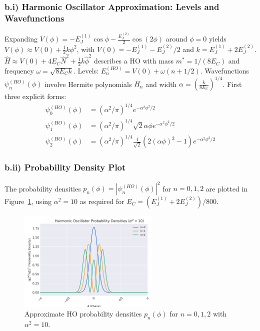 \documentclass[12pt]{article}
\begin{document}
\begin{appendices}
\subsubsection*{b.i) Harmonic Oscillator Approximation: Levels and Wavefunctions}
\label{app:part_b:subsubsec_i}
Expanding $V(\phi) = -E_J^{(1)} \cos \phi - \frac{E_J^{(2)}}{2} \cos (2 \phi)$ around $\phi=0$ yields $V(\phi) \approx V(0) + \frac{1}{2} k \phi^2$, with $V(0) = -E_J^{(1)} - E_J^{(2)}/2$ and $k = E_J^{(1)} + 2 E_J^{(2)}$. $\hat{H} \approx V(0) + 4 E_C \hat{N}^2 + \frac{1}{2} k \hat{\phi}^2$ describes a HO with mass $m^* = 1/(8E_C)$ and frequency $\omega = \sqrt{8 E_C k}$. Levels: $E_n^{(HO)} = V(0) + \omega(n+1/2)$. Wavefunctions $\psi_n^{(HO)}(\phi)$ involve Hermite polynomials $H_n$ and width $\alpha = \left( \frac{k}{8 E_C} \right)^{1/4}$. First three explicit forms:
\begin{align*}
\psi_0^{(HO)}(\phi) &= (\alpha^2/\pi)^{1/4} e^{-\alpha^2\phi^2/2} \\
\psi_1^{(HO)}(\phi) &= (\alpha^2/\pi)^{1/4} \sqrt{2}\alpha\phi e^{-\alpha^2\phi^2/2} \\
\psi_2^{(HO)}(\phi) &= (\alpha^2/\pi)^{1/4} \frac{1}{\sqrt{2}} (2(\alpha\phi)^2 - 1) e^{-\alpha^2\phi^2/2} 
\end{align*}

\subsubsection*{b.ii) Probability Density Plot}
\label{app:part_b:subsubsec_ii}
The probability densities $p_n(\phi)=|\psi_n^{(HO)}(\phi)|^2$ for $n=0,1,2$ are plotted in Figure~\ref{fig:app_ho_probs}, using $\alpha^2=10$ as required for $E_C = (E_J^{(1)}+2E_J^{(2)})/800$.

\begin{figure}[htbp]
    \centering
    \includegraphics[width=0.6\textwidth]{fig_ho_prob.png} 
    \caption{Approximate HO probability densities $p_n(\phi)$ for $n=0,1,2$ with $\alpha^2=10$.}
    \label{fig:app_ho_probs} 
\end{figure}


\end{appendices}
\end{document}
